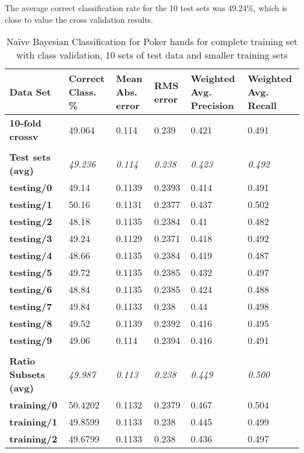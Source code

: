 \documentclass[11pt, a4paper]{article}
\begin{document}
The average correct classification rate for the 10 test sets was 49.24\%, which is close to value the cross validation results. 

\begin{table}[htbp]
  \centering
  \begin{tabular}{p{3cm}p{1.5cm}p{1.5cm}p{1.5cm}p{1.5cm}p{1.5cm}}
    \toprule
    \textbf{Data Set} & Correct Class. \% & Mean Abs. error & RMS error & Weighted Avg. Precision & Weighted Avg. Recall \\
    \midrule
    \textbf{10-fold crossv} & 49.064 & 0.114 & 0.239 & 0.421 & 0.491 \\
    \textbf{} &       &       &       &       &  \\
    \textbf{Test sets (avg)} & \textit{49.236} & \textit{0.114} & \textit{0.238} & \textit{0.423} & \textit{0.492} \\
    \textbf{   testing/0} & 49.14 & 0.1139 & 0.2393 & 0.414 & 0.491 \\
    \textbf{   testing/1} & 50.16 & 0.1131 & 0.2377 & 0.437 & 0.502 \\
    \textbf{   testing/2} & 48.18 & 0.1135 & 0.2384 & 0.41  & 0.482 \\
    \textbf{   testing/3} & 49.24 & 0.1129 & 0.2371 & 0.418 & 0.492 \\
    \textbf{   testing/4} & 48.66 & 0.1135 & 0.2384 & 0.419 & 0.487 \\
    \textbf{   testing/5} & 49.72 & 0.1135 & 0.2385 & 0.432 & 0.497 \\
    \textbf{   testing/6} & 48.84 & 0.1135 & 0.2385 & 0.424 & 0.488 \\
    \textbf{   testing/7} & 49.84 & 0.1133 & 0.238 & 0.44  & 0.498 \\
    \textbf{   testing/8} & 49.52 & 0.1139 & 0.2392 & 0.416 & 0.495 \\
    \textbf{   testing/9} & 49.06 & 0.114 & 0.2394 & 0.416 & 0.491 \\
    \textbf{} &       &       &       &       &  \\
    \textbf{Ratio Subsets (avg)} & \textit{49.987} & \textit{0.113} & \textit{0.238} & \textit{0.449} & \textit{0.500} \\
    \textbf{   training/0} & 50.4202 & 0.1132 & 0.2379 & 0.467 & 0.504 \\
    \textbf{   training/1} & 49.8599 & 0.1133 & 0.238 & 0.445 & 0.499 \\
    \textbf{   training/2} & 49.6799 & 0.1133 & 0.238 & 0.436 & 0.497 \\
    \bottomrule
    \end{tabular}%

	\caption{Na\"ive Bayesian Classification for Poker hands for complete training set with class validation, 10 sets of test data and smaller training sets}   
  \label{tab:nbresults}%
\end{table}%
\end{document}
